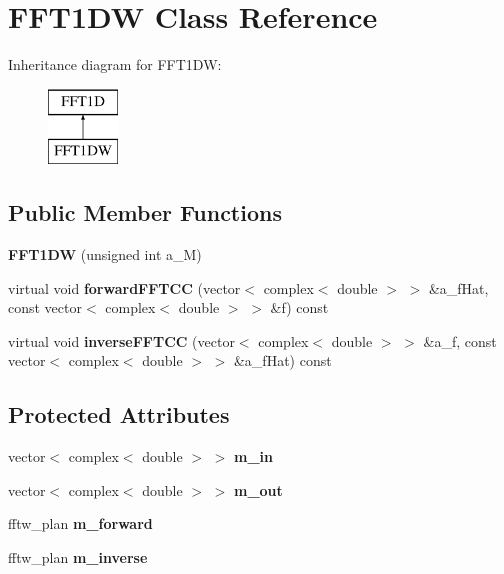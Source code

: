\hypertarget{class_f_f_t1_d_w}{}\section{F\+F\+T1\+DW Class Reference}
\label{class_f_f_t1_d_w}
Inheritance diagram for F\+F\+T1\+DW\+:\begin{figure}[H]
\begin{center}
\leavevmode
\includegraphics[height=2.000000cm]{class_f_f_t1_d_w}
\end{center}
\end{figure}
\subsection*{Public Member Functions}
\begin{DoxyCompactItemize}
\item 
\mbox{\label{class_f_f_t1_d_w_a8ee1895cec2e681fd0f2927e98b7e6be}} 
{\bfseries F\+F\+T1\+DW} (unsigned int a\+\_\+M)
\item 
\mbox{\label{class_f_f_t1_d_w_accb0b00b28181e1e723a5611331003fe}} 
virtual void {\bfseries forward\+F\+F\+T\+CC} (vector$<$ complex$<$ double $>$ $>$ \&a\+\_\+f\+Hat, const vector$<$ complex$<$ double $>$ $>$ \&f) const
\item 
\mbox{\label{class_f_f_t1_d_w_ab3e7120a9966709cbf6095af90c0811f}} 
virtual void {\bfseries inverse\+F\+F\+T\+CC} (vector$<$ complex$<$ double $>$ $>$ \&a\+\_\+f, const vector$<$ complex$<$ double $>$ $>$ \&a\+\_\+f\+Hat) const
\end{DoxyCompactItemize}
\subsection*{Protected Attributes}
\begin{DoxyCompactItemize}
\item 
\mbox{\label{class_f_f_t1_d_w_a8cbc1a46dca9b0031244a9004f2207a5}} 
vector$<$ complex$<$ double $>$ $>$ {\bfseries m\+\_\+in}
\item 
\mbox{\label{class_f_f_t1_d_w_adf99327f7fb95163620c4f629baf276c}} 
vector$<$ complex$<$ double $>$ $>$ {\bfseries m\+\_\+out}
\item 
\mbox{\label{class_f_f_t1_d_w_a2299f3623ee6fe0c5a1f5e354bd9027f}} 
fftw\+\_\+plan {\bfseries m\+\_\+forward}
\item 
\mbox{\label{class_f_f_t1_d_w_a471a064f64ecc9dc4d6fba8f61e747c2}} 
fftw\+\_\+plan {\bfseries m\+\_\+inverse}
\end{DoxyCompactItemize}


